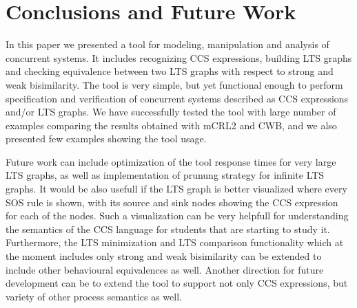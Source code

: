 \section{Conclusions and Future Work}
\label{sec:conclusion}

In this paper we presented a tool for modeling, manipulation and analysis of concurrent systems. It includes recognizing CCS expressions, building LTS graphs and checking equivalence between two LTS graphs with respect to strong and weak bisimilarity. The tool is very simple, but yet functional enough to perform specification and verification of concurrent systems described as CCS expressions and/or LTS graphs. We have successfully tested the tool with large number of examples comparing the results obtained with mCRL2 and CWB, and we also presented few examples showing the tool usage. 

Future work can include optimization of the tool response times for very large LTS graphs, as well as implementation of prunung strategy for infinite LTS graphs. It would be also usefull if the LTS graph is better visualized where every SOS rule is shown, with its source and sink nodes showing the CCS expression for each of the nodes. Such a visualization can be very helpfull for understanding the semantics of the CCS language for students that are starting to study it. Furthermore, the LTS minimization and LTS comparison functionality which at the moment includes only strong and weak bisimilarity can be extended to include other behavioural equivalences as well. Another direction for future development can be to extend the tool to support not only CCS expressions, but variety of other process semantics as well. 
